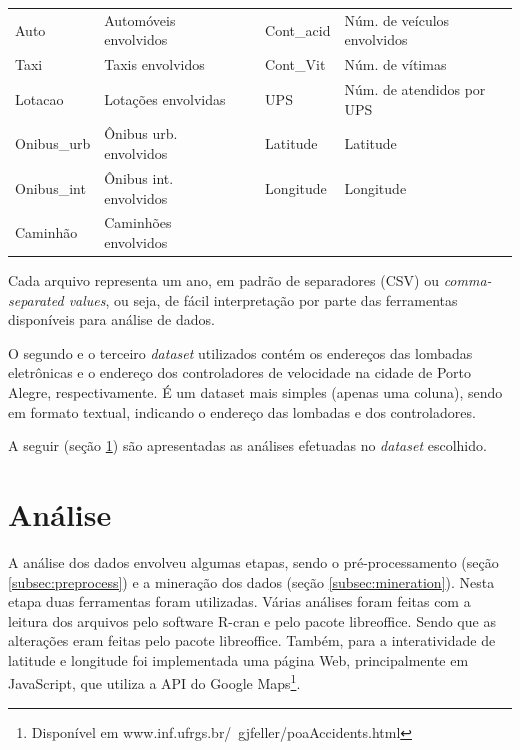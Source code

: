 \documentclass[11pt,article,oneside,a4paper]{abntex2}
\begin{document}
\begin{table}[h]
\begin{small}
\begin{center}
\begin{tabular}{|p{2cm}|p{5cm}|p{}|p{2cm}|p{5cm}|}
Auto        & Automóveis envolvidos          && Cont\_acid  & Núm. de veículos envolvidos           \\ \cline{1-2} \cline{4-5}
Taxi        & Taxis envolvidos               && Cont\_Vit   & Núm. de vítimas                     \\ \cline{1-2} \cline{4-5}
Lotacao     & Lotações envolvidas            && UPS         & Núm. de atendidos por UPS           \\ \cline{1-2} \cline{4-5}
Onibus\_urb & Ônibus urb. envolvidos         && Latitude    & Latitude                            \\ \cline{1-2} \cline{4-5}
Onibus\_int & Ônibus int. envolvidos         && Longitude   & Longitude                           \\ \cline{1-2} \cline{4-5}
Caminhão    & Caminhões envolvidos           &\multicolumn{1}{c}{}& \multicolumn{1}{c}{}& \multicolumn{1}{c}{}        \\ \cline{1-2}
		\end{tabular} 
	\end{center}
	\end{small}
\end{table}

Cada arquivo representa um ano, em padrão de separadores (CSV) ou \textit{comma-separated values}, ou seja, de fácil interpretação por parte das ferramentas disponíveis para análise de dados.

O segundo e o terceiro \textit{dataset} utilizados contém os endereços das lombadas eletrônicas e o endereço dos controladores de velocidade na cidade de Porto Alegre, respectivamente. É um dataset mais simples (apenas uma coluna), sendo em formato textual, indicando o endereço das lombadas e dos controladores.

A seguir (seção \ref{sec:analise}) são apresentadas as análises efetuadas no \textit{dataset} escolhido.

\section{Análise} 
\label{sec:analise}

A análise dos dados envolveu algumas etapas, sendo o pré-processamento (seção \ref{subsec:preprocess}) e a mineração dos dados (seção \ref{subsec:mineration}). Nesta etapa duas ferramentas foram utilizadas. Várias análises foram feitas com a leitura dos arquivos pelo software R-cran e pelo pacote libreoffice. Sendo que as alterações eram feitas pelo pacote libreoffice. Também, para a interatividade de latitude e longitude foi implementada uma página Web, principalmente em JavaScript, que utiliza a API do Google Maps\footnote{Disponível em www.inf.ufrgs.br/~gjfeller/poaAccidents.html}.
\end{document}
